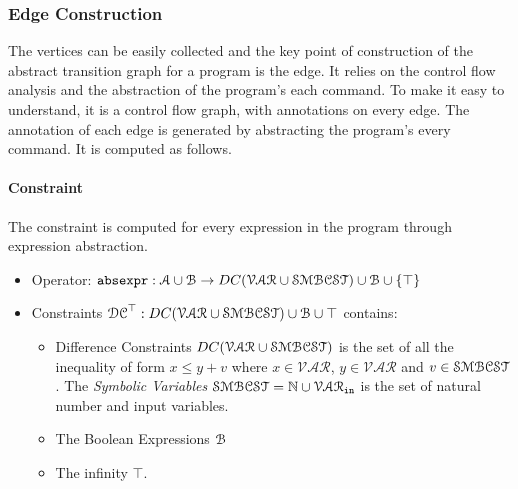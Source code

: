 \subsubsection{Edge Construction}
\label{sec:abscfg-edge}
  The vertices can be easily collected and the key point of construction of the abstract
  transition graph for a program is the edge.
  It relies on the control flow analysis and the abstraction of the program's each command.
  To make it easy to understand, it
  is a control flow graph, with annotations on every edge.
  The annotation of each edge is generated by abstracting the program's every command.
It is computed as follows.
%
\paragraph{Constraint}
The constraint is computed for every expression in the program through expression abstraction.

\begin{itemize}
\item Operator: $\mathtt{abs}{\mathtt{expr}} : \mathcal{A} \cup \mathcal{B} \to DC(\mathcal{VAR}  \cup \mathcal{SMBCST})\cup \mathcal{B} \cup \{\top\}$
%
\item Constraints $\mathcal{DC}^{\top}: DC(\mathcal{VAR}  \cup \mathcal{SMBCST}) \cup \mathcal{B} \cup \top$  contains:
%
\begin{itemize}
\item Difference Constraints $DC(\mathcal{VAR}  \cup \mathcal{SMBCST})$ is the set of all the inequality of form $x \leq y + v$ where $x \in \mathcal{VAR} $, 
$y \in \mathcal{VAR}$ and $v \in \mathcal{SMBCST}$.
The \emph{Symbolic Variables} $\mathcal{SMBCST} = \mathbb{N} \cup \mathcal{VAR}_{\mathtt{in}}$ is the set of natural number and input variables. 
%
\item The Boolean Expressions $\mathcal{B}$
%
\item The infinity $\top$.
\end{itemize}
\end{itemize}

